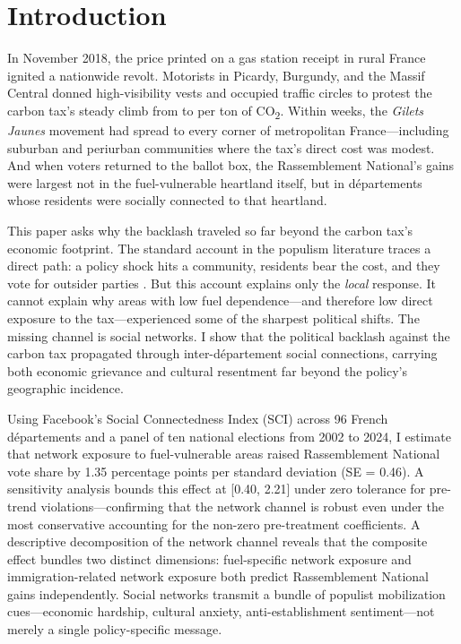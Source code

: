 \documentclass[12pt]{article}
\providecommand{\euro}{\texteuro}
\newcommand{\rn}{Rassemblement National}
\newcommand{\gj}{\textit{Gilets Jaunes}}
\newcommand{\dept}{d\'{e}partement}
\newcommand{\depts}{d\'{e}partements}
\begin{document}

\section{Introduction}
\label{sec:intro}

In November 2018, the price printed on a gas station receipt in rural France ignited a nationwide revolt. Motorists in Picardy, Burgundy, and the Massif Central donned high-visibility vests and occupied traffic circles to protest the carbon tax's steady climb from \euro 7 to \euro 44.60 per ton of CO\textsubscript{2}. Within weeks, the \gj{} movement had spread to every corner of metropolitan France---including suburban and periurban communities where the tax's direct cost was modest. And when voters returned to the ballot box, the \rn{}'s gains were largest not in the fuel-vulnerable heartland itself, but in \depts{} whose residents were socially connected to that heartland.

This paper asks why the backlash traveled so far beyond the carbon tax's economic footprint. The standard account in the populism literature traces a direct path: a policy shock hits a community, residents bear the cost, and they vote for outsider parties \citep{autor2013china, colantone2018trade, fetzer2019did}. But this account explains only the \emph{local} response. It cannot explain why areas with low fuel dependence---and therefore low direct exposure to the tax---experienced some of the sharpest political shifts. The missing channel is social networks. I show that the political backlash against the carbon tax propagated through inter-\dept{} social connections, carrying both economic grievance and cultural resentment far beyond the policy's geographic incidence.

Using Facebook's Social Connectedness Index (SCI) across 96 French \depts{} and a panel of ten national elections from 2002 to 2024, I estimate that network exposure to fuel-vulnerable areas raised \rn{} vote share by 1.35 percentage points per standard deviation (SE = 0.46). A \citet{rambachan2023more} sensitivity analysis bounds this effect at [0.40, 2.21] under zero tolerance for pre-trend violations---confirming that the network channel is robust even under the most conservative accounting for the non-zero pre-treatment coefficients. A descriptive decomposition of the network channel reveals that the composite effect bundles two distinct dimensions: fuel-specific network exposure and immigration-related network exposure both predict \rn{} gains independently. Social networks transmit a bundle of populist mobilization cues---economic hardship, cultural anxiety, anti-establishment sentiment---not merely a single policy-specific message.
\end{document}
